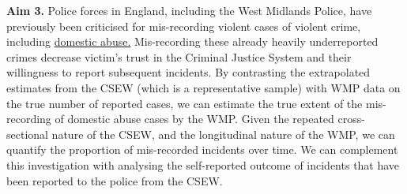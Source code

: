 \documentclass[11pt, a4paper]{article}
\newcommand{\NS}[1] {{\textcolor{green}{#1}}}
\begin{document}
\textbf{Aim 3.} Police forces in England, including the West Midlands Police, have previously been criticised for mis-recording violent cases of violent crime, including \href{https://www.bbc.co.uk/news/uk-england-468676578}{domestic abuse.} Mis-recording these already heavily underreported crimes decrease victim's trust in the Criminal Justice System and their willingness to report subsequent incidents. By contrasting the extrapolated estimates from the CSEW (which is a representative sample) with WMP data on the true number of reported cases, we can estimate the true extent of the mis-recording of domestic abuse cases by the WMP. Given the repeated cross-sectional nature of the CSEW, and the longitudinal nature of the WMP, we can quantify the proportion of mis-recorded incidents over time. We can complement this investigation with analysing the self-reported outcome of incidents that have been reported to the police from the CSEW.






%
%
%
%
	


\end{document}
